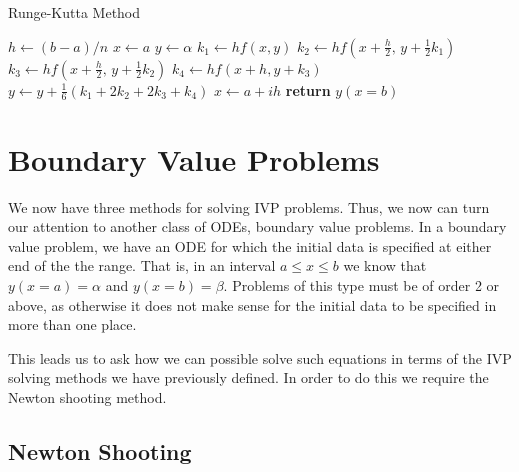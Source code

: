 \documentclass[a4paper,11pt]{report}
\begin{document}
\begin{algorithm}
\caption{Runge-Kutta Method}\label{midpoint-runge}
\begin{algorithmic}[1]
	\State $h \gets (b-a)/n$
	\State $x \gets a$ 
	\State $y \gets \alpha$ 
		\State $k_1 \gets h f(x,y)$
		\State $k_2 \gets h f\left(x + \frac{h}{2}, \, y + \frac{1}{2} k_1\right)$
		\State $k_3 \gets h f\left(x + \frac{h}{2}, \, y + \frac{1}{2} k_2 \right)$
		\State $k_4 \gets h f(x + h, y + k_3)$
		\State $y \gets y + \frac{1}{6}\left(k_1 + 2k_2 + 2k_3 + k_4\right)$ 
		\State $x \gets a + ih$ 
	\EndFor
	\State \textbf{return} $y(x=b)$ 
	\EndProcedure
\end{algorithmic}
\end{algorithm}

\section{Boundary Value Problems}

We now have three methods for solving IVP problems. Thus, we now can turn our attention to another class of ODEs, boundary value problems. In a boundary value problem, we have an ODE for which the initial data is specified at either end of the the range. That is, in an interval $a\leq x \leq b$ we know that $y(x=a) = \alpha$ and $y(x=b) = \beta$. Problems of this type must be of order 2 or above, as otherwise it does not make sense for the initial data to be specified in more than one place.

This leads us to ask how we can possible solve such equations in terms of the IVP solving methods we have previously defined. In order to do this we require the Newton shooting method.

\subsection{Newton Shooting}
\end{document}
